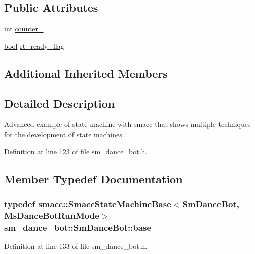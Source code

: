 \subsection*{Public Attributes}
\begin{DoxyCompactItemize}
\item 
int \hyperlink{structsm__dance__bot_1_1SmDanceBot_ab3b8db557ce94d34c60b291911eb140c}{counter\+\_}
\item 
\hyperlink{classbool}{bool} \hyperlink{structsm__dance__bot_1_1SmDanceBot_a0f0587a13670ad8925555cd8f6cb6b2d}{rt\+\_\+ready\+\_\+flag}
\end{DoxyCompactItemize}
\subsection*{Additional Inherited Members}


\subsection{Detailed Description}
Advanced example of state machine with smacc that shows multiple techniques for the development of state machines. 

Definition at line 123 of file sm\+\_\+dance\+\_\+bot.\+h.



\subsection{Member Typedef Documentation}
\subsubsection[{\texorpdfstring{base}{base}}]{\setlength{\rightskip}{0pt plus 5cm}typedef {\bf smacc\+::\+Smacc\+State\+Machine\+Base}$<${\bf Sm\+Dance\+Bot}, {\bf Ms\+Dance\+Bot\+Run\+Mode}$>$ {\bf sm\+\_\+dance\+\_\+bot\+::\+Sm\+Dance\+Bot\+::base}}\hypertarget{structsm__dance__bot_1_1SmDanceBot_a33b03e67fc72482c067af48e1f9d95a3}{}\label{structsm__dance__bot_1_1SmDanceBot_a33b03e67fc72482c067af48e1f9d95a3}


Definition at line 133 of file sm\+\_\+dance\+\_\+bot.\+h.

